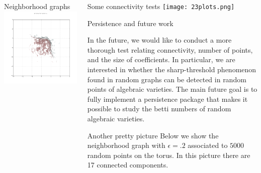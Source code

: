 \documentclass{beamer}
\begin{document}
\begin{frame}{}
\begin{columns}[t]
\begin{column}{0.32\linewidth}
\begin{block}{Neighborhood graphs}
\includegraphics[width=1\columnwidth]{plot2d_ng_7}
\end{block}

\end{column}%

\begin{column}{0.32\linewidth}

\begin{block}{Some connectivity tests}
\texttt{[image: 23plots.png]}
\end{block}



\begin{block}{Persistence and future work}

In the future, we would like to conduct a more thorough test relating
connectivity, number of points, and the size of coefficients. In particular, we
are interested in whether the sharp-threshold phenomenon found in random graphs
can be detected in random points of algebraic varieties.
The main future goal is to fully implement a persistence package that makes it
possible to study the betti numbers of random algebraic varieties.

\end{block}
\begin{block}{Another pretty picture}
Below we show the neighborhood graph with $\epsilon=.2$ associated to $5000$
random points on the torus. In this picture there are 17 connected components.


\end{block}
\end{column}
\end{columns}
\end{frame}
\end{document}
